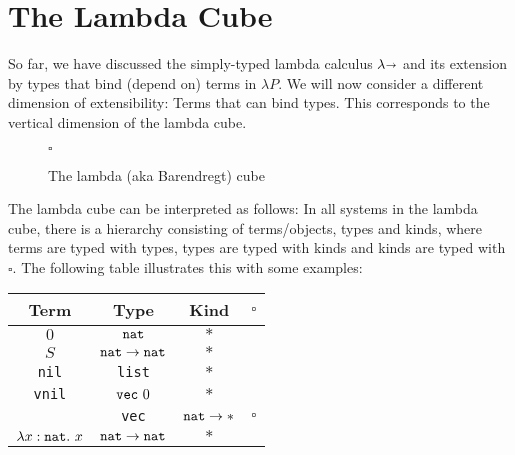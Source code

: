 \section{The Lambda Cube}
So far, we have discussed the simply-typed lambda calculus $\lambda\kern -.25em \shortrightarrow$ and its extension by
types that bind (depend on) terms in $\lambda P$.
We will now consider a different dimension of extensibility: Terms that can bind types.
This corresponds to the vertical dimension of the lambda cube.

\begin{figure}[htbp]
    $\square$
    \caption{The lambda (aka Barendregt) cube}
\end{figure}

The lambda cube can be interpreted as follows:
In all systems in the lambda cube, there is a hierarchy consisting of terms/objects, types and kinds,
where terms are typed with types, types are typed with kinds and kinds are typed with $\square$.
The following table illustrates this with some examples:

\begin{center}
    \begin{tabular}{c|c|c|c}
        Term & Type & Kind & $\square$ \\
        \hline
        $0$ & $\texttt{nat}$ & $\ast$ & \\
        $S$ & $\texttt{nat} \to \texttt{nat}$ & $\ast$ & \\
        \verb|nil| & \verb|list| & $\ast$ & \\
        \verb|vnil| & $\verb|vec|\ 0$ & $\ast$ & \\
        & \verb|vec| & $\texttt{nat} \to \ast$ & $\square$ \\
        $\lambda x : \texttt{nat}.\ x$ & $\texttt{nat} \to \texttt{nat}$ & $\ast$ &
    \end{tabular}
\end{center}

